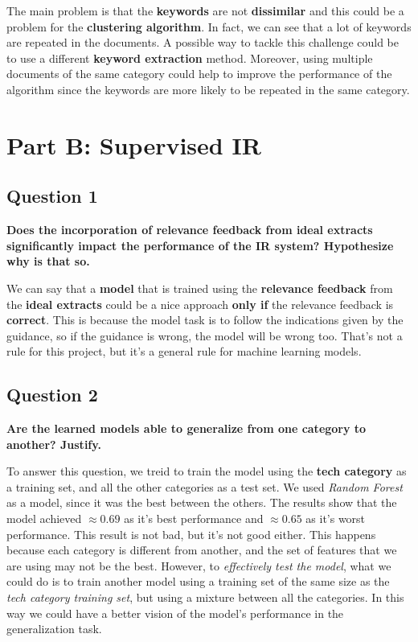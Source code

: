 The main problem is that the \textbf{keywords} are not \textbf{dissimilar} and
this could be a problem for the \textbf{clustering algorithm}. In fact, we can
see that a lot of keywords are repeated in the documents. A possible way to
tackle this challenge could be to use a different \textbf{keyword extraction} method. Moreover, using multiple documents of the same
category could help to improve the performance of the algorithm since the
keywords are more likely to be repeated in the same category.

\section*{Part B: Supervised IR}
\subsection{Question 1}
\textbf{ Does the incorporation of relevance feedback from ideal extracts significantly impact the performance of the IR system? Hypothesize why is that so.}

We can say that a \textbf{model} that is trained using the \textbf{relevance
  feedback} from the \textbf{ideal extracts} could be a nice approach \textbf{only if} the relevance feedback is \textbf{correct}. This is 
  because the model task is to follow the indications given by the guidance, so if the guidance is wrong, the model will be wrong too. That's 
  not a rule for this project, but it's a general rule for machine learning models.

\subsection{Question 2}
\textbf{ Are the learned models able to generalize from one category to another? Justify.}

To answer this question, we treid to train the model using the \textbf{tech category} as a training set, and 
all the other categories as a test set. We used \textit{Random Forest} as a model, since it was the best between the others.
The results show that the model achieved $\approx 0.69$ as it's best performance and $\approx 0.65$ as it's worst performance. 
This result is not bad, but it's not good either. This happens because each category is different from another, and the set of features 
that we are using may not be the best. However, to \textit{effectively test the model}, what we could do is to train another model 
using a training set of the same size as the \textit{tech category training set}, but using a mixture between all the categories.
In this way we could have a better vision of the model's performance in the generalization task. 

